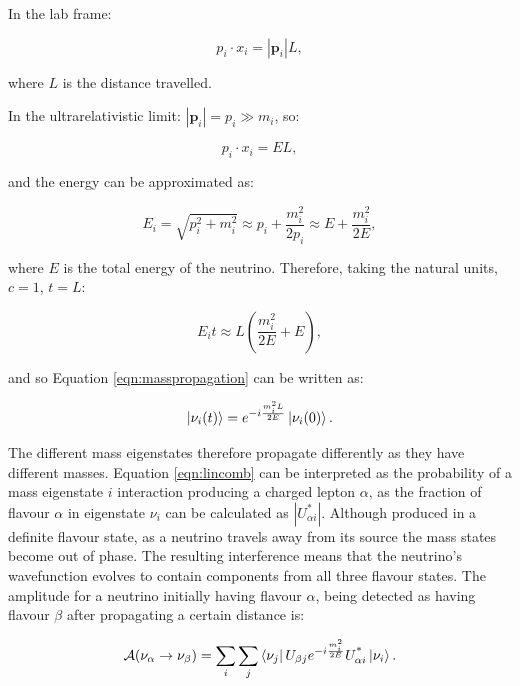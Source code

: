 In the lab frame:

\begin{equation}
p_i\cdot x_i = |\mathbf{p}_i|L,
\end{equation}

where $L$ is the distance travelled.

In the ultrarelativistic limit: $|\mathbf{p}_i| = p_i \gg m_i$, so:

\begin{equation}
 p_i\cdot x_i  = EL,
\end{equation}

and the energy can be approximated as:

\begin{equation}
E_{i} = \sqrt{p_i^2 + m_i^2} \approx p_i + \frac{m_i^2}{2p_i} \approx E + \frac{m_i^2}{2E},
\end{equation}

where $E$ is the total energy of the neutrino. Therefore, taking the natural units, $c=1$, $t=L$:

\begin{equation}
E_i t\approx L(\frac{m_i^2}{2E}+E),
\end{equation}

and so Equation \eqref{eqn:masspropagation} can be written as:

\begin{equation}
\ket{\nu_{i}(t)}=e^{-i\frac{m_i^2L}{2E}}\ket{\nu_i(0)}.
\end{equation}

The different mass eigenstates therefore propagate differently as they have different masses. Equation \eqref{eqn:lincomb} can be interpreted as the probability of a mass eigenstate $i$ interaction producing a charged lepton $\alpha$, as the fraction of flavour $\alpha$ in eigenstate $\nu_i$ can be calculated as $|U^\text{*}_{\alpha i}|$.  Although produced in a definite flavour state, as a neutrino travels away from its source the mass states become out of phase. The resulting interference means that the neutrino's wavefunction evolves to contain components from all three flavour states. The amplitude for a neutrino initially having flavour $\alpha$, being detected as having flavour $\beta$ after propagating a certain distance is:

\begin{equation}
\mathcal{A}(\nu_\alpha \rightarrow \nu_\beta) = \sum_i \sum_j \bra{\nu_j}U_{\beta j}e^{-i\frac{m_i^2}{2E}}U^{\text{*}}_{\alpha i}\ket{\nu_i}.
\end{equation}

